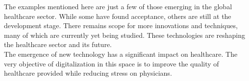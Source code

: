 \documentclass[12pt]{article}
\begin{document}
 \indent
 The examples mentioned here are just a few of those emerging in the global healthcare sector. While some have found acceptance, others are still at the development stage. There remains scope for more innovations and techniques, many of which are currently yet being studied. These technologies are reshaping the healthcare sector and its future. 
 \\
 The emergence of new technology has a significant impact on healthcare. The very objective of digitalization in this space is to improve the quality of healthcare provided while reducing stress on physicians.
\end{document}
